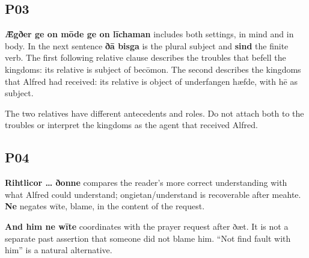 \subsection*{P03}

\par\begin{minipage}{\linewidth}\raggedright
\textbf{Ǣgðer ge on mōde ge on līchaman} includes both settings, in mind and in body. In the next sentence \textbf{ðā bisga} is the plural subject and \textbf{sind} the finite verb. The first following relative clause describes the troubles that befell the kingdoms: its relative is subject of becōmon. The second describes the kingdoms that Alfred had received: its relative is object of underfangen hæfde, with hē as subject.

The two relatives have different antecedents and roles. Do not attach both to the troubles or interpret the kingdoms as the agent that received Alfred.

\end{minipage}\par\addvspace{4pt}

\subsection*{P04}

\par\begin{minipage}{\linewidth}\raggedright
\textbf{Rihtlicor … ðonne} compares the reader’s more correct understanding with what Alfred could understand; ongietan/\allowbreak{}understand is recoverable after meahte. \textbf{Ne} negates wīte, blame, in the content of the request.

\textbf{And him ne wīte} coordinates with the prayer request after ðæt. It is not a separate past assertion that someone did not blame him. “Not find fault with him” is a natural alternative.

\end{minipage}\par\addvspace{4pt}

